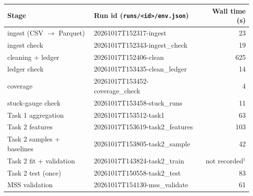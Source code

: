 \begin{tabular}{llr}
\toprule
Stage & Run id (\texttt{runs/<id>/env.json}) & Wall time (s) \\
\midrule
ingest (CSV $\to$ Parquet) & 20261017T152317-ingest & 23 \\
ingest check & 20261017T152343-ingest\_check & 19 \\
cleaning + ledger & 20261017T152406-clean & 625 \\
ledger check & 20261017T153435-clean\_ledger & 14 \\
coverage & 20261017T153452-coverage\_check & 4 \\
stuck-gauge check & 20261017T153458-stuck\_runs & 11 \\
Task 1 aggregation & 20261017T153512-task1 & 63 \\
Task 2 features & 20261017T153619-task2\_features & 103 \\
Task 2 samples + baselines & 20261017T153805-task2\_sample & 42 \\
Task 2 fit + validation & 20261017T143824-task2\_train & not recorded$^{\dagger}$ \\
Task 2 test (once) & 20261017T150558-task2\_test & 83 \\
MSS validation & 20261017T154130-mss\_validate & 61 \\
\bottomrule
\end{tabular}
